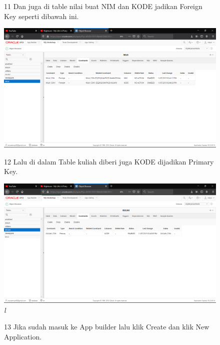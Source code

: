 \begin{enumerate}
\begin{figure}
\item[11]Dan juga di table nilai buat NIM dan KODE jadikan Foreign Key seperti dibawah ini.
    \begin{center}
\includegraphics[scale=0.2]{figures/23.png}
    \caption{\textit{}}
        \end{center}
\label{gambar}
\end{figure}

\begin{figure}
\item[12]Lalu di dalam Table kuliah diberi juga KODE dijadikan Primary Key.

    \begin{center}
\includegraphics[scale=0.2]{figures/24.png}
    \caption{\textit{l}}
        \end{center}
\label{gambar}
\end{figure}

\begin{figure}
\item[13]Jika sudah masuk ke App builder lalu klik Create dan klik New Application.


\end{figure}
\end{enumerate}
